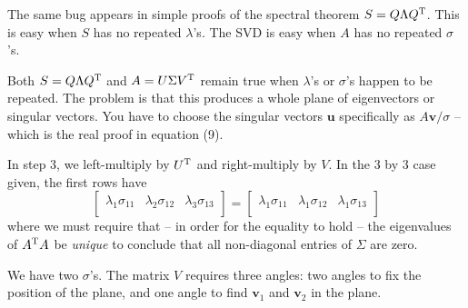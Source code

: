 \documentclass[a4paper]{article}
\begin{document}
{The same bug appears in simple proofs of the spectral theorem \(S = Q \Lambda Q^{\textsc{T}}\). This is easy when \(S\) has no repeated \(\lambda\)'s. The SVD is easy when \(A\) has no repeated \(\sigma\)'s.

Both \(S = Q \Lambda Q^{\textsc{T}}\) and \(A = U \Sigma V^{\textsc{T}}\) remain true when \(\lambda\)'s or \(\sigma\)'s happen to be repeated. The problem is that this produces a whole plane of eigenvectors or singular vectors. You have to choose the singular vectors \(\bm{u}\) specifically as \(A \bm{v} / \sigma\) -- which is the real proof in equation (9).}

In step 3, we left-multiply by \(U^{\textsc{T}}\) and right-multiply by \(V\). In the 3 by 3 case given, the first rows have
\[
	\begin{bmatrix}
		\lambda_{1}\sigma_{11} & \lambda_{2}\sigma_{12} & \lambda_{3}\sigma_{13} \\
	\end{bmatrix}
	=
	\begin{bmatrix}
		\lambda_{1}\sigma_{11} & \lambda_{1}\sigma_{12} & \lambda_{1}\sigma_{13} \\
	\end{bmatrix}
\]
where we must require that -- in order for the equality to hold -- the eigenvalues of \(A^{\textsc{T}}A\) be \textit{unique} to conclude that all non-diagonal entries of \(\Sigma\) are zero. 

\vspace{12pt}


We have two \(\sigma\)'s. The matrix \(V\) requires three angles: two angles to fix the position of the plane, and one angle to find \(\bm{v}_{1}\) and \(\bm{v}_{2}\) in the plane. 
\end{document}
